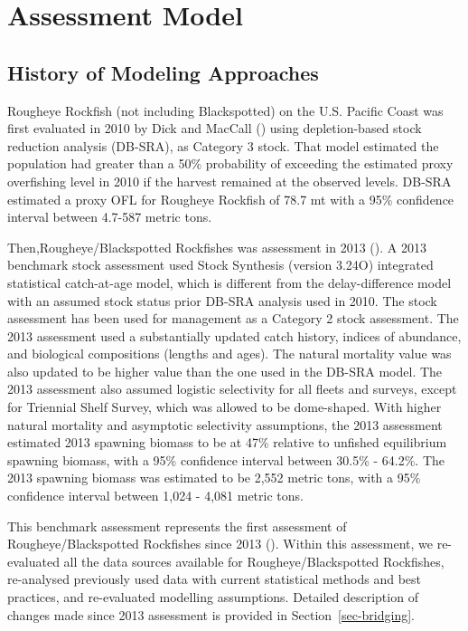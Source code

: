 \documentclass[
]{scrartcl}
\begin{document}
\newpage{}

\section{Assessment Model}\label{assessment-model}

\subsection{History of Modeling
Approaches}\label{history-of-modeling-approaches}

Rougheye Rockfish (not including Blackspotted) on the U.S. Pacific Coast
was first evaluated in 2010 by Dick and MacCall
() using depletion-based stock
reduction analysis (DB-SRA), as Category 3 stock. That model estimated
the population had greater than a 50\% probability of exceeding the
estimated proxy overfishing level in 2010 if the harvest remained at the
observed levels. DB-SRA estimated a proxy OFL for Rougheye Rockfish of
78.7 mt with a 95\% confidence interval between 4.7-587 metric tons.

Then,Rougheye/Blackspotted Rockfishes was assessment in 2013
(). A
2013 benchmark stock assessment used Stock Synthesis (version 3.24O)
integrated statistical catch-at-age model, which is different from the
delay-difference model with an assumed stock status prior DB-SRA
analysis used in 2010. The stock assessment has been used for management
as a Category 2 stock assessment. The 2013 assessment used a
substantially updated catch history, indices of abundance, and
biological compositions (lengths and ages). The natural mortality value
was also updated to be higher value than the one used in the DB-SRA
model. The 2013 assessment also assumed logistic selectivity for all
fleets and surveys, except for Triennial Shelf Survey, which was allowed
to be dome-shaped. With higher natural mortality and asymptotic
selectivity assumptions, the 2013 assessment estimated 2013 spawning
biomass to be at 47\% relative to unfished equilibrium spawning biomass,
with a 95\% confidence interval between 30.5\% - 64.2\%. The 2013
spawning biomass was estimated to be 2,552 metric tons, with a 95\%
confidence interval between 1,024 - 4,081 metric tons.

This benchmark assessment represents the first assessment of
Rougheye/Blackspotted Rockfishes since 2013
().
Within this assessment, we re-evaluated all the data sources available
for Rougheye/Blackspotted Rockfishes, re-analysed previously used data
with current statistical methods and best practices, and re-evaluated
modelling assumptions. Detailed description of changes made since 2013
assessment is provided in Section~\ref{sec-bridging}.
\end{document}
